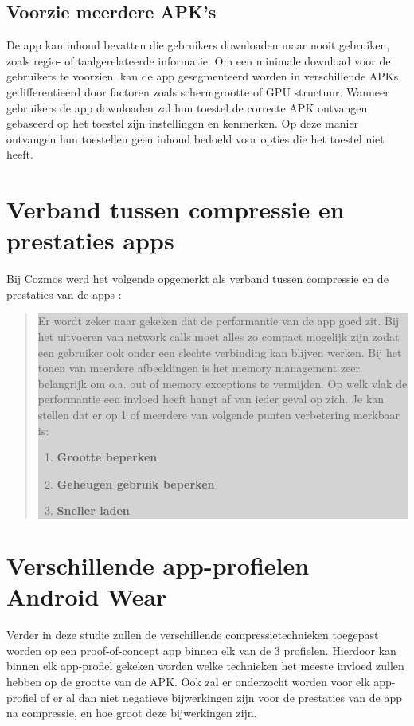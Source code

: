 \subsection{Voorzie meerdere APK's}
\label{sec:multipleapks}
De app kan inhoud bevatten die gebruikers downloaden maar nooit gebruiken, zoals regio- of taalgerelateerde informatie. Om een minimale download voor de gebruikers te voorzien, kan de app gesegmenteerd worden in verschillende APKs, gedifferentieerd door factoren zoals schermgrootte of GPU structuur.
Wanneer gebruikers de app downloaden zal hun toestel de correcte APK ontvangen gebaseerd op het toestel zijn instellingen en kenmerken. Op deze manier ontvangen hun toestellen geen inhoud bedoeld voor opties die het toestel niet heeft.


\section{Verband tussen compressie en prestaties apps}
\label{sec:verbandcompressieprestaties}
Bij Cozmos werd het volgende opgemerkt als verband tussen compressie en de prestaties van de apps :
\begin{quote}
\colorbox{lightgray}{\parbox{350px}{Er wordt zeker naar gekeken dat de performantie van de app goed zit. Bij het uitvoeren van network calls moet alles zo compact mogelijk zijn zodat een gebruiker ook onder een slechte verbinding kan blijven werken. Bij het tonen van meerdere afbeeldingen is het memory management zeer belangrijk om o.a. out of memory exceptions te vermijden. Op welk vlak de performantie een invloed heeft hangt af van ieder geval op zich. Je kan stellen dat er op 1 of meerdere van volgende punten verbetering merkbaar is: \begin{enumerate}
			\item \textbf{Grootte beperken}
			\item \textbf{Geheugen gebruik beperken}
			\item \textbf{Sneller laden}
		\end{enumerate}
}}
\end{quote}

\section{Verschillende app-profielen Android Wear}
Verder in deze studie zullen de verschillende compressietechnieken toegepast worden op een proof-of-concept app binnen elk van de 3 profielen. Hierdoor kan binnen elk app-profiel gekeken worden welke technieken het meeste invloed zullen hebben op de grootte van de APK. Ook zal er onderzocht worden voor elk app-profiel of er al dan niet negatieve bijwerkingen zijn voor de prestaties van de app na compressie, en hoe groot deze bijwerkingen zijn. 
